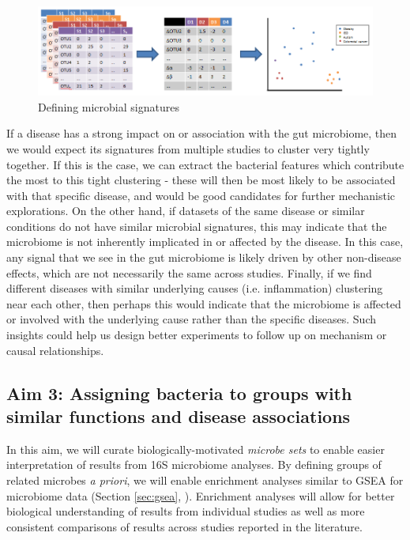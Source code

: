 \documentclass[12pt]{article}
\begin{document}
\begin{figure}
\begin{center}
\includegraphics[scale=0.5]{microbial_signatures}
\caption{Defining microbial signatures}\label{fig:microbe_signatures}
\end{center}
\end{figure}

If a disease has a strong impact on or association with the gut 
microbiome, then we would expect its signatures from multiple studies 
to cluster very tightly together. If this is the case, we can extract 
the bacterial features which contribute the most to this tight 
clustering - these will then be most likely to be associated with that 
specific disease, and would be good candidates for further mechanistic 
explorations. On the other hand, if datasets of the same disease or 
similar conditions do not have similar microbial signatures, this may 
indicate that the microbiome is not inherently implicated in or affected 
by the disease. In this case, any signal that we see in the gut 
microbiome is likely driven by other non-disease effects, which are 
not necessarily the same across studies. Finally, if we find different 
diseases with similar underlying causes (i.e. inflammation) clustering 
near each other, then perhaps this would indicate that the microbiome 
is affected or involved with the underlying cause rather than the 
specific diseases. Such insights could help us design better 
experiments to follow up on mechanism or causal relationships.

\subsection{Aim 3: Assigning bacteria to groups with similar functions and disease associations}

In this aim, we will curate biologically-motivated \textit{microbe 
sets} to enable easier interpretation of results from 16S microbiome 
analyses. By defining groups of related microbes \textit{a priori}, we 
will enable enrichment analyses similar to GSEA for microbiome data (Section \ref{sec:gsea}, 
\cite{subramanian-gsea-2005}). Enrichment analyses will allow for better 
biological understanding of results from individual studies as well as 
more consistent comparisons of results across studies reported in 
the literature.
\end{document}
